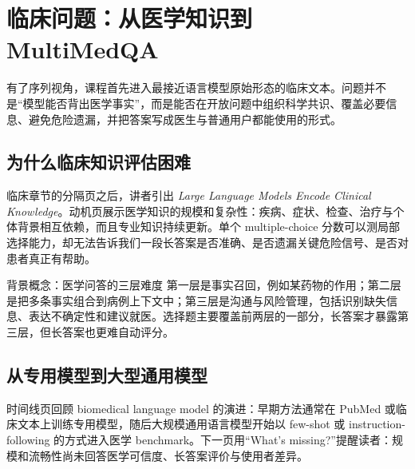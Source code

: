 \section{临床问题：从医学知识到 MultiMedQA}

有了序列视角，课程首先进入最接近语言模型原始形态的临床文本。问题并不是“模型能否背出医学事实”，而是能否在开放问题中组织科学共识、覆盖必要信息、避免危险遗漏，并把答案写成医生与普通用户都能使用的形式。

\subsection{为什么临床知识评估困难}

临床章节的分隔页之后，讲者引出 \emph{Large Language Models Encode Clinical Knowledge}。动机页展示医学知识的规模和复杂性：疾病、症状、检查、治疗与个体背景相互依赖，而且专业知识持续更新。单个 multiple-choice 分数可以测局部选择能力，却无法告诉我们一段长答案是否准确、是否遗漏关键危险信号、是否对患者真正有帮助。




\begin{knowledgebox}{背景概念：医学问答的三层难度}
第一层是事实召回，例如某药物的作用；第二层是把多条事实组合到病例上下文中；第三层是沟通与风险管理，包括识别缺失信息、表达不确定性和建议就医。选择题主要覆盖前两层的一部分，长答案才暴露第三层，但长答案也更难自动评分。
\end{knowledgebox}

\subsection{从专用模型到大型通用模型}

时间线页回顾 biomedical language model 的演进：早期方法通常在 PubMed 或临床文本上训练专用模型，随后大规模通用语言模型开始以 few-shot 或 instruction-following 的方式进入医学 benchmark。下一页用“What's missing?”提醒读者：规模和流畅性尚未回答医学可信度、长答案评价与使用者差异。


